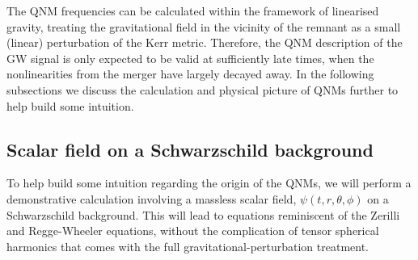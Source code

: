 The QNM frequencies can be calculated within the framework of linearised gravity, treating the gravitational field in the vicinity of the remnant as a small (linear) perturbation of the Kerr metric.
Therefore, the QNM description of the GW signal is only expected to be valid at sufficiently late times, when the nonlinearities from the merger have largely decayed away. 
In the following subsections we discuss the calculation and physical picture of QNMs further to help build some intuition.


\subsection{Scalar field on a Schwarzschild background}

To help build some intuition regarding the origin of the QNMs, we will perform a demonstrative calculation involving a massless scalar field, $\psi(t,r,\theta,\phi)$ on a Schwarzschild background.
This will lead to equations reminiscent of the Zerilli and Regge-Wheeler equations, without the complication of tensor spherical harmonics that comes with the full gravitational-perturbation treatment.

